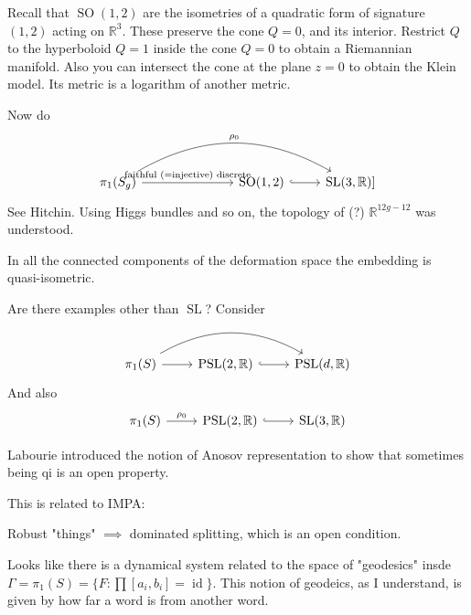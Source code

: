 \begin{example}
	Recall that $\operatorname{SO}(1,2)$ are the isometries of a quadratic form of signature $(1,2)$ acting on  $\mathbb{R}^{3}$. These preserve the cone $Q=0$, and its interior. Restrict $Q$ to the hyperboloid $Q=1$ inside the cone $Q=0$ to obtain a Riemannian manifold. Also you can intersect the cone at the plane $z=0$ to obtain the Klein model. Its metric is a logarithm of another metric.

	Now do
	 \[\begin{tikzcd}
		 \pi_{1}(S_g) \arrow[rrrr, bend left,"\rho_0"]\arrow[rrr,"\text{faithful (=injective) discrete} "]&&&\operatorname{SO}(1,2) \arrow[r,hook]&\operatorname{SL}(3,\mathbb{R})]
	\end{tikzcd}\]
See Hitchin. Using Higgs bundles and so on, the topology of (?) $\mathbb{R}^{12g-12}$ was understood.

\begin{thm}[Labourie]\leavevmode
	In all the connected components of the deformation space the embedding is quasi-isometric.
\end{thm}

\begin{question}[Misha]
	Are there examples other than $\operatorname{SL}$? Consider
	\[\begin{tikzcd}
		\pi_{1}(S) \arrow[r]\arrow[rr,bend left]&\operatorname{PSL}(2,\mathbb{R})\arrow[r,hook]& \operatorname{PSL}(d,\mathbb{R})
	\end{tikzcd}\]
	And also
	\[\begin{tikzcd}
		\pi_{1}(S) \arrow[r,"\rho_0"]&\operatorname{PSL}(2,\mathbb{R})\arrow[r,hook]&\operatorname{SL}(3,\mathbb{R})
	\end{tikzcd}\]
\end{question}
\end{example}

Labourie introduced the notion of Anosov representation to show that sometimes being qi is an open property.

This is related to IMPA:

\begin{thm}\leavevmode
	Robust "things" $\implies $ dominated splitting, which is an open condition.
\end{thm}

Looks like there is a dynamical system related to the space of "geodesics" insde  $\Gamma=\pi_{1}(S) =\{F:\prod [a_i,b_i]=\operatorname{id} \}$. This notion of geodeics, as I understand, is given by how far a word is from another word.

